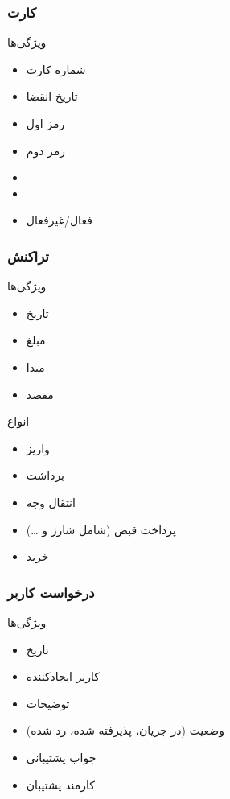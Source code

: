 \documentclass{article}
\begin{document}
        \subsubsection{کارت}
            ویژگی‌ها
            \begin{itemize}
                \item شماره کارت
                \item تاریخ انقضا
                \item رمز اول
                \item رمز دوم
                \item {}
                \item {}
                \item فعال/غیرفعال
            \end{itemize}

        \subsubsection{تراکنش}
            ویژگی‌ها
            \begin{itemize}
                \item تاریخ
                \item مبلغ
                \item مبدا
                \item مقصد
            \end{itemize}
            انواع
            \begin{itemize}
                \item واریز
                \item برداشت
                \item انتقال وجه
                \item پرداخت قبض (شامل شارژ و \dots)
                \item خرید
            \end{itemize}
            
        \subsubsection{درخواست کاربر}
            ویژگی‌ها
            \begin{itemize}
                \item تاریخ
                \item کاربر ایجادکننده
                \item توضیحات
                \item وضعیت (در جریان، پذیرفته شده، رد شده)
                \item جواب پشتیبانی
                \item کارمند پشتیبان
            \end{itemize}
\end{document}
